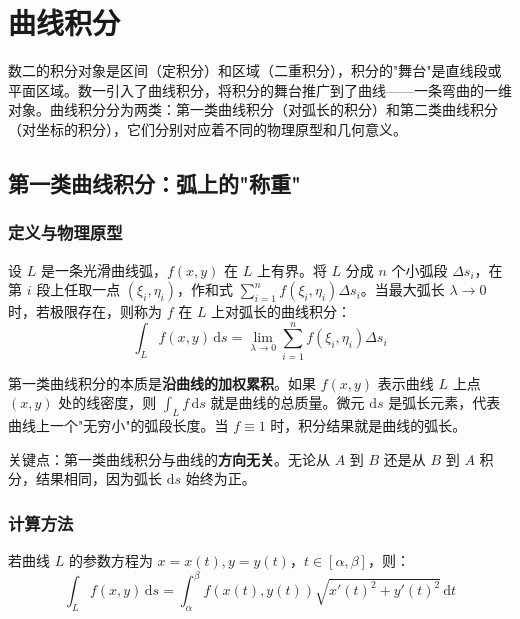 
\section{曲线积分}

数二的积分对象是区间（定积分）和区域（二重积分），积分的"舞台"是直线段或平面区域。数一引入了曲线积分，将积分的舞台推广到了曲线——一条弯曲的一维对象。曲线积分分为两类：第一类曲线积分（对弧长的积分）和第二类曲线积分（对坐标的积分），它们分别对应着不同的物理原型和几何意义。

\subsection{第一类曲线积分：弧上的"称重"}

\subsubsection{定义与物理原型}

设 $L$ 是一条光滑曲线弧，$f(x,y)$ 在 $L$ 上有界。将 $L$ 分成 $n$ 个小弧段 $\Delta s_i$，在第 $i$ 段上任取一点 $(\xi_i,\eta_i)$，作和式 $\sum_{i=1}^n f(\xi_i,\eta_i)\Delta s_i$。当最大弧长 $\lambda\to 0$ 时，若极限存在，则称为 $f$ 在 $L$ 上对弧长的曲线积分：
\[
\int_L f(x,y)\,\mathrm{d}s = \lim_{\lambda\to 0}\sum_{i=1}^n f(\xi_i,\eta_i)\Delta s_i
\]

\begin{essencebox}
第一类曲线积分的本质是\textbf{沿曲线的加权累积}。如果 $f(x,y)$ 表示曲线 $L$ 上点 $(x,y)$ 处的线密度，则 $\int_L f\,\mathrm{d}s$ 就是曲线的总质量。微元 $\mathrm{d}s$ 是弧长元素，代表曲线上一个"无穷小"的弧段长度。当 $f\equiv 1$ 时，积分结果就是曲线的弧长。

关键点：第一类曲线积分与曲线的\textbf{方向无关}。无论从 $A$ 到 $B$ 还是从 $B$ 到 $A$ 积分，结果相同，因为弧长 $\mathrm{d}s$ 始终为正。
\end{essencebox}

\subsubsection{计算方法}

若曲线 $L$ 的参数方程为 $x=x(t), y=y(t)$，$t\in[\alpha,\beta]$，则：
\[
\int_L f(x,y)\,\mathrm{d}s = \int_\alpha^\beta f(x(t),y(t))\sqrt{x'(t)^2+y'(t)^2}\,\mathrm{d}t
\]

